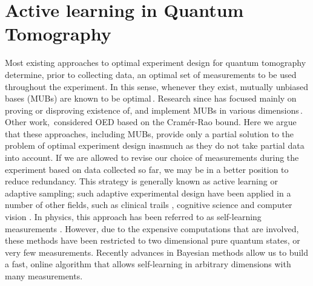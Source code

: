 
\section{Active learning in Quantum Tomography}

Most existing approaches to optimal experiment design for quantum tomography determine, prior to collecting data, an optimal set of measurements to be used throughout the experiment. In this sense, whenever they exist, mutually unbiased bases (MUBs) are known to be optimal\,\citep{MUBFirst,MUBExperiment}. Research since has focused mainly on proving or disproving existence of, and implement MUBs in various dimensions\,\citep{DimensionSix,MUBQutrit,MUBExperiment}. Other work,\,\citep{OEDFirst,OEDAverage} considered OED based on the Cram\'{e}r-Rao bound. Here we argue that these approaches, including MUBs, provide only a partial solution to the problem of optimal experiment design inasmuch as they do not take partial data into account. If we are allowed to revise our choice of measurements during the experiment based on data collected so far, we may be in a better position to reduce redundancy. This strategy is generally known as active learning or adaptive sampling; such adaptive experimental design have been applied in a number of other fields, such as clinical trails \citep{Berry2006}, cognitive science \citep{Cavagnaro2010} and computer vision \citep{Vondrick2011}. In physics, this approach has been referred to as self-learning measurements \citep{SelfLearning, SelfLearningExperimental}. However, due to the expensive computations that are involved, these methods have been restricted to two dimensional pure quantum states, or very few measurements. Recently advances in Bayesian methods allow us to build a fast, online algorithm that allows self-learning in arbitrary dimensions with many measurements. 

